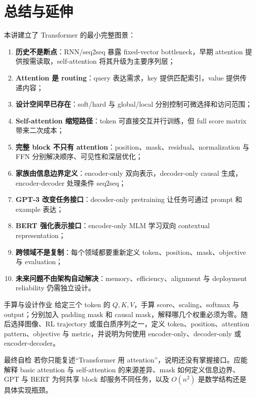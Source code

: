 \section{总结与延伸}

本讲建立了 Transformer 的最小完整图景：

\begin{enumerate}
  \item \textbf{历史不是断点}：RNN/seq2seq 暴露 fixed-vector bottleneck，早期 attention 提供按需读取，self-attention 将其升级为主要序列层；
  \item \textbf{Attention 是 routing}：query 表达需求，key 提供匹配索引，value 提供传递内容；
  \item \textbf{设计空间早已存在}：soft/hard 与 global/local 分别控制可微选择和访问范围；
  \item \textbf{Self-attention 缩短路径}：token 可直接交互并行训练，但 full score matrix 带来二次成本；
  \item \textbf{完整 block 不只有 attention}：position、mask、residual、normalization 与 FFN 分别解决顺序、可见性和深层优化；
  \item \textbf{家族由信息边界定义}：encoder-only 双向表示，decoder-only causal 生成，encoder-decoder 处理条件 seq2seq；
  \item \textbf{GPT-3 改变任务接口}：decoder-only pretraining 让任务可通过 prompt 和 example 表达；
  \item \textbf{BERT 强化表示接口}：encoder-only MLM 学习双向 contextual representation；
  \item \textbf{跨领域不是复制}：每个领域都要重新定义 token、position、mask、objective 与 evaluation；
  \item \textbf{未来问题不由架构自动解决}：memory、efficiency、alignment 与 deployment reliability 仍需独立设计。
\end{enumerate}

\begin{importantbox}{手算与设计作业}
给定三个 token 的 $Q,K,V$，手算 score、scaling、softmax 与 output；分别加入 padding mask 和 causal mask，解释哪几个权重必须为零。随后选择图像、RL trajectory 或蛋白质序列之一，定义 token、position、attention pattern、objective 与 metric，并说明为何使用 encoder-only、decoder-only 或 encoder-decoder。
\end{importantbox}

\begin{warningbox}{最终自检}
若你只能复述“Transformer 用 attention”，说明还没有掌握接口。应能解释 basic attention 与 self-attention 的来源差异、mask 如何定义信息边界、GPT 与 BERT 为何共享 block 却服务不同任务，以及 $O(n^2)$ 是数学结构还是具体实现瓶颈。
\end{warningbox}

